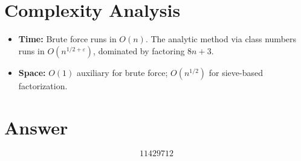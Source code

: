 \documentclass[11pt]{article}
\begin{document}
\section{Complexity Analysis}

\begin{itemize}
\item \textbf{Time:} Brute force runs in $O(n)$. The analytic method via class numbers runs in $O(n^{1/2+\varepsilon})$, dominated by factoring $8n+3$.
\item \textbf{Space:} $O(1)$ auxiliary for brute force; $O(n^{1/2})$ for sieve-based factorization.
\end{itemize}

\section{Answer}

\[
\boxed{11429712}
\]
\end{document}
